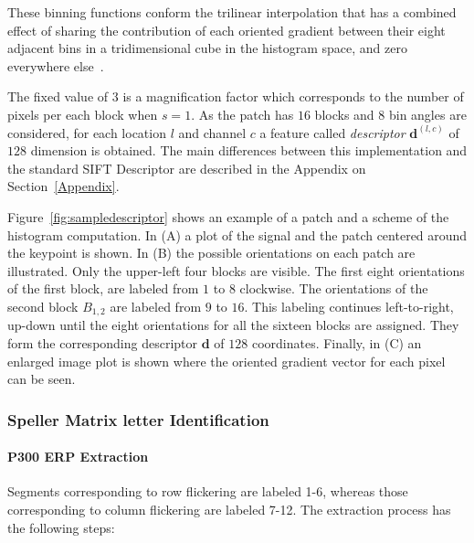 \documentclass[utf8]{frontiersSCNS} %
\begin{document}
These binning functions conform the trilinear interpolation that has a combined effect of sharing the contribution of each oriented gradient between their eight adjacent bins in a tridimensional cube in the histogram space, and zero everywhere else~\citep{Mortensen2005}.

The fixed value of $ 3 $ is a magnification factor which corresponds to the number of pixels per each block when $s = 1$.  As the patch has  $16$ blocks and  $8$ bin angles are considered, for each location $l$ and channel $c$ a feature called \textit{descriptor} $\mathbf{d}^{(l,c)}$  of $128$ dimension is obtained.  The main differences between this implementation and the standard SIFT Descriptor are described in the Appendix on Section~\ref{Appendix}.

Figure~\ref{fig:sampledescriptor} shows an example of a patch and a scheme of the histogram computation. In (A) a plot of the signal and the patch centered around the keypoint is shown. In (B) the possible orientations on each patch are illustrated.  Only the upper-left four blocks are visible.  The first eight orientations of the first block, are labeled from $1$ to $8$ clockwise. The orientations of the second block $ B_{1,2} $ are labeled from $9$ to $16$.  This labeling continues left-to-right, up-down until the eight orientations for all the sixteen blocks are assigned. They form the corresponding descriptor $\mathbf{d}$ of $128$ coordinates. Finally, in (C) an enlarged image plot is shown where the oriented gradient vector for each pixel can be seen.
 
\subsubsection{Speller Matrix letter Identification}
\label{Classification}

\paragraph{P300 ERP Extraction}
Segments corresponding to row flickering are labeled 1-6, whereas those corresponding to column flickering are labeled 7-12.  The extraction process has the following steps:
\end{document}
